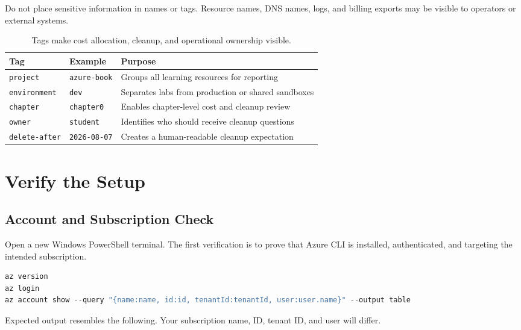 Do not place sensitive information in names or tags. Resource names, DNS names, logs, and billing exports may be visible to operators or external systems.

\begin{table}[H]
\centering
\small
\begin{tabular}{@{}p{3.0cm}p{4.0cm}p{5.8cm}@{}}
\toprule
\textbf{Tag} & \textbf{Example} & \textbf{Purpose} \\
\midrule
\texttt{project} & \texttt{azure-book} & Groups all learning resources for reporting \\
\texttt{environment} & \texttt{dev} & Separates labs from production or shared sandboxes \\
\texttt{chapter} & \texttt{chapter0} & Enables chapter-level cost and cleanup review \\
\texttt{owner} & \texttt{student} & Identifies who should receive cleanup questions \\
\texttt{delete-after} & \texttt{2026-08-07} & Creates a human-readable cleanup expectation \\
\bottomrule
\end{tabular}
\caption{Tags make cost allocation, cleanup, and operational ownership visible.}
\label{tab:chapter0-tags}
\end{table}

\section{Verify the Setup}

\subsection{Account and Subscription Check}
Open a new Windows PowerShell terminal. The first verification is to prove that Azure CLI is installed, authenticated, and targeting the intended subscription.

\begin{lstlisting}[language=PowerShell,caption={Verifying the selected Azure subscription.},label={lst:verify-account}]
az version
az login
az account show --query "{name:name, id:id, tenantId:tenantId, user:user.name}" --output table
\end{lstlisting}

Expected output resembles the following. Your subscription name, ID, tenant ID, and user will differ.

